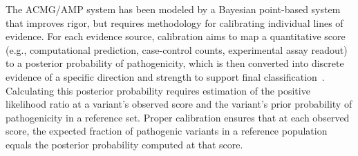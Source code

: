 \documentclass[11pt]{article}
\theoremstyle{plain}
\begin{document}
The ACMG/AMP system has been modeled by a Bayesian point-based system \cite{tavtigian2018modeling,Tavtigian2020} that improves rigor, but requires methodology for calibrating individual lines of evidence. For each evidence source, calibration aims to map a quantitative score (e.g., computational prediction, case-control counts, experimental assay readout) to a posterior probability of pathogenicity, which is then converted into discrete evidence of a specific direction and strength to support %
final classification~\cite{richards2015standards, Tavtigian2020}. Calculating this posterior probability requires estimation of %
the positive likelihood ratio at a variant's observed score and the variant's prior probability of pathogenicity %
in a reference set. Proper calibration ensures that at each observed score, the expected fraction of pathogenic variants in a reference population equals the posterior probability computed at that score.
\end{document}
